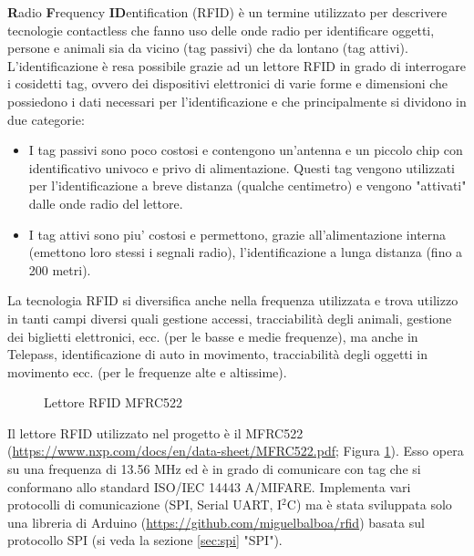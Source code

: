\documentclass[12pt]{report}
\begin{document}
\textbf{R}adio \textbf{F}requency \textbf{ID}entification (RFID) è un termine utilizzato per descrivere tecnologie contactless che fanno uso delle onde radio per identificare oggetti, persone e animali sia da vicino (tag passivi) che da lontano (tag attivi). L'identificazione è resa possibile grazie ad un lettore RFID in grado di interrogare i cosidetti tag, ovvero dei dispositivi elettronici di varie forme e dimensioni che possiedono i dati necessari per l'identificazione e che principalmente si dividono in due categorie: 

\begin{itemize}
	\item I tag passivi sono poco costosi e contengono un'antenna e un piccolo chip con identificativo univoco e privo di alimentazione. Questi tag vengono utilizzati per l'identificazione a breve distanza (qualche centimetro) e vengono "attivati" dalle onde radio del lettore.
	\item I tag attivi sono piu' costosi e permettono, grazie all'alimentazione interna (emettono loro stessi i segnali radio), l'identificazione a lunga distanza (fino a 200 metri).
\end{itemize}

La tecnologia RFID si diversifica anche nella frequenza utilizzata e trova utilizzo in tanti campi diversi quali gestione accessi, tracciabilità degli animali, gestione dei biglietti elettronici, ecc$.$ (per le basse e medie frequenze), ma anche in Telepass, identificazione di auto in movimento, tracciabilità degli oggetti in movimento ecc. (per le frequenze alte e altissime).

\begin{figure}
	\caption{Lettore RFID MFRC522}
	\label{fig:mfrc522}
\end{figure}

Il lettore RFID utilizzato nel progetto è il MFRC522 (\url{https://www.nxp.com/docs/en/data-sheet/MFRC522.pdf}; Figura \ref{fig:mfrc522}). Esso opera su una frequenza di 13.56 MHz ed è in grado di comunicare con tag che si conformano allo standard ISO/IEC 14443 A/MIFARE. Implementa vari protocolli di comunicazione (SPI, Serial UART, I$^2$C) ma è stata sviluppata solo una libreria di Arduino (\url{https://github.com/miguelbalboa/rfid}) basata sul protocollo SPI (si veda la sezione \ref{sec:spi} "SPI").
\end{document}
